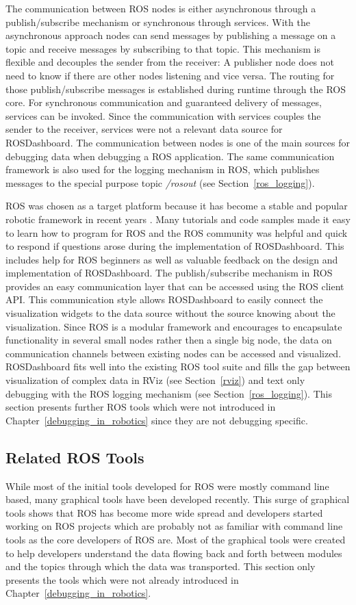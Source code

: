The communication between ROS nodes is either asynchronous through a publish/subscribe mechanism or synchronous through services. With the asynchronous approach nodes can send messages by publishing a message on a topic and receive messages by subscribing to that topic. This mechanism is flexible and decouples the sender from the receiver: A publisher node does not need to know if there are other nodes listening and vice versa. The routing for those publish/subscribe messages is established during runtime through the ROS core. For synchronous communication and guaranteed delivery of messages, services can be invoked. Since the communication with services couples the sender to the receiver, services were not a relevant data source for ROSDashboard. The communication between nodes is one of the main sources for debugging data when debugging a ROS application. The same communication framework is also used for the logging mechanism in ROS, which publishes messages to the special purpose topic \emph{/rosout} (see Section~\ref{ros_logging}).

ROS was chosen as a target platform because it has become a stable and popular robotic framework in recent years \cite{Foote2012}. Many tutorials and code samples made it easy to learn how to program for ROS and the ROS community was helpful and quick to respond if questions arose during the implementation of ROSDashboard. This includes help for ROS beginners as well as valuable feedback on the design and implementation of ROSDashboard. The publish/subscribe mechanism in ROS provides an easy communication layer that can be accessed using the ROS client API. This communication style allows ROSDashboard to easily connect the visualization widgets to the data source without the source knowing about the visualization. Since ROS is a modular framework and encourages to encapsulate functionality in several small nodes rather then a single big node, the data on communication channels between existing nodes can be accessed and visualized. ROSDashboard fits well into the existing ROS tool suite and fills the gap between visualization of complex data in RViz (see Section~\ref{rviz}) and text only debugging with the ROS logging mechanism (see Section~\ref{ros_logging}). This section presents further ROS tools which were not introduced in Chapter~\ref{debugging_in_robotics} since they are not debugging specific.

\subsection{Related ROS Tools}
While most of the initial tools developed for ROS were mostly command line based, many graphical tools have been developed recently. This surge of graphical tools shows that ROS has become more wide spread and developers started working on ROS projects which are probably not as familiar with command line tools as the core developers of ROS are. Most of the graphical tools were created to help developers understand the data flowing back and forth between modules and the topics through which the data was transported. This section only presents the tools which were not already introduced in Chapter~\ref{debugging_in_robotics}.

